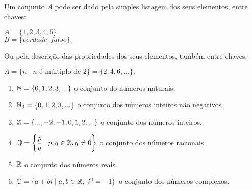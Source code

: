 \documentclass{beamer}
\begin{document}
    \begin{frame}
        Um conjunto $A$ pode ser dado pela simples listagem dos seus elementos, entre chaves:\pause
            \begin{center}
                $A = \{1,2,3,4,5\}$\pause\\
                $B = \{verdade, falso\}.$\pause
            \end{center}
            

        Ou pela descri{\c c}{\~a}o das propriedades dos seus elementos, também  entre chaves:\pause
        \begin{center}
            $A = \{n \mid n \mbox{ \'e m{\'u}ltiplo de } 2\} = \{2,4,6,...\}.$
        \end{center}

        \begin{enumerate}[label={\arabic*})]
            \item $\mathbb{N} = \{0,1,2,3,...\}$ o conjunto do n{\'u}meros naturais.\pause
            \item $\mathbb{N}_0 = \{0,1,2,3,...\}$ o conjunto dos n{\'u}meros inteiros n{\~a}o negativos.\pause
            \item $\mathbb{Z} = \{...,-2,-1,0,1,2,...\}$ o conjunto dos n{\'u}meros inteiros.\pause
            \item $\mathbb{Q} = \left\{\dfrac{p}{q} \mid p,q \in \mathbb{Z}, q \neq 0 \right\}$ o conjunto dos n{\'u}meros racionais.\pause
            \item $\mathbb{R} $ o conjunto dos n{\'u}meros reais.\pause
            \item $\mathbb{C} = \{a + bi \mid a,b \in \mathbb{R},\ i^2 = -1\}$ o conjunto dos n\'umeros complexos.
        \end{enumerate}
    \end{frame}
\end{document}
